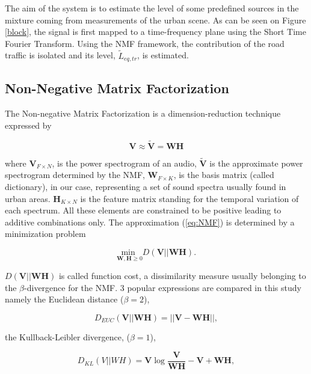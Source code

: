 \documentclass{article}
\begin{document}
\begin{sloppy}
The aim of the system is to estimate the level of some predefined sources in the mixture coming from measurements of the urban scene. As can be seen on Figure \ref{block}, the signal is first mapped to a time-frequency plane using the Short Time Fourier Transform. Using the NMF framework, the contribution of the road traffic is isolated and its level, $\tilde{L}_{eq,tr}$, is estimated.

\subsection{Non-Negative Matrix Factorization}
The Non-negative Matrix Factorization is a dimension-reduction technique expressed by

\begin{equation}\label{eq:NMF}
\mathbf{V} \approx \mathbf{\tilde{V}} = \mathbf{WH}
\end{equation}

where $\mathbf{V}_{F \times N}$, is the power spectrogram of an audio, $\mathbf{\tilde{V}}$ is the approximate power spectrogram determined by the NMF, $\mathbf{W}_{F \times K}$, is the basis matrix (called dictionary), in our case, representing a set of sound spectra usually found in urban areas. $\mathbf{H}_{K \times N}$ is the feature matrix standing for the temporal variation of each spectrum. All these elements are constrained to be positive leading to additive combinations only. The approximation (\ref{eq:NMF}) is determined by a minimization problem

\begin{equation}\label{eq:minCost}
\underset{\mathbf{W},\mathbf{H} \geq 0}{\text{min }} D(\mathbf{V}\vert\vert \mathbf{WH}).
\end{equation}

$D(\mathbf{V}\vert\vert \mathbf{WH})$ is called function cost, a dissimilarity measure usually belonging to the $\beta$-divergence for the NMF. 3 popular expressions are compared in this study namely the Euclidean distance ($\beta = 2$),

\begin{equation}\label{eq:distEUC}
D_{EUC}(\mathbf{V} \vert \vert \mathbf{WH}) =  \vert\vert \mathbf{V} - \mathbf{WH} \vert\vert , 
\end{equation} 

the Kullback-Leibler divergence, ($\beta = 1$), 

\begin{equation}\label{eq:divKL}
D_{KL}(V\vert\vert WH) = \mathbf{V}\log\frac{\mathbf{V}}{\mathbf{WH}}-\mathbf{V}+\mathbf{WH},
\end{equation}


\end{sloppy}
\end{document}
